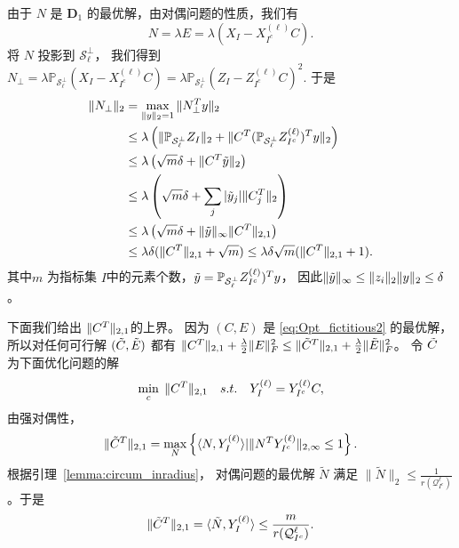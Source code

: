 \documentclass{ctexart}
\begin{document}
由于 $N$ 是 $\mathbf{D}_1$ 的最优解，由对偶问题的性质，我们有
$$ N=\lambda E=\lambda(X_I-X^{(\ell)}_{I^c}C). $$
将 $N$ 投影到 $\mathcal{S}^{\perp}_{\ell}$， 我们得到
$N_{\perp}=\lambda \mathbb{P}_{\mathcal{S}_{\ell}^{\perp}}(X_I-X^{(\ell)}_{I^c}C)
= \lambda \mathbb{P}_{\mathcal{S}_{\ell}^{\perp}}(Z_I-Z^{(\ell)}_{I^c}C)^2$.
于是
\begin{align}
  \|N_{\perp}\|_2 & = \max_{\|y\|_2=1} \|N_{\perp}^T y\|_2 \nonumber \\
  & \leq\lambda \left(\|\mathbb{P}_{\mathcal{S}_{\ell}^{\perp}}Z_I\|_2
  +\|C^T (\mathbb{P}_{\mathcal{S}_{\ell}^{\perp}}Z^{(\ell)}_{I^c})^T y\|_2\right)\nonumber\\
  & \leq \lambda\left( \sqrt{m} \delta + \|C^T \tilde{y}\|_2\right) \nonumber\\
  & \leq \lambda\left( \sqrt{m} \delta + \sum_j |\tilde{y}_j|\|C^T_j\|_2\right) \nonumber\\
  & \leq \lambda\left( \sqrt{m} \delta + \|\tilde{y}\|_{\infty}\|C^T\|_{2,1}\right) \nonumber\\
  & \leq \lambda \delta(\|C^T\|_{2,1}+\sqrt{m}) \leq \lambda\delta\sqrt{m}(\|C^T\|_{2,1}+1). \label{eq:bounding_nu2}
\end{align}
其中$m$ 为指标集 $I$中的元素个数，$\tilde{y}=\mathbb{P}_{\mathcal{S}_{\ell}^{\perp}}Z^{(\ell)}_{I^c})^Ty$，
因此$\|\tilde{y}\|_{\infty} \leq \|z_i\|_2 \|y\|_2 \leq \delta$。

下面我们给出 $\|C^T\|_{2,1}$的上界。
因为 $(C,E)$ 是 \eqref{eq:Opt_fictitious2} 的最优解，所以对任何可行解 $(\tilde{C} ,\tilde{E})$
都有 $\|C^T\|_{2,1}+\frac{\lambda}{2}\|E\|^2_F \leq \|\tilde{C}^T\|_{2,1}+\frac{\lambda}{2}\|\tilde{E}\|_F^2$。
令 $\tilde{C}$ 为下面优化问题的解
\begin{align}\label{eq:Opt_y only}
\min_{c} \; \|C^T\|_{2,1} \quad
s.t. \quad Y^{(\ell)}_I=Y^{(\ell)}_{I^c}C,
\end{align}
由强对偶性，
$$\|\tilde{C}^T\|_{2,1} = \max_{N}\left\{\langle N,Y^{(\ell)}_I\rangle | \|N^T
Y^{(\ell)}_{I^c}\|_{2, \infty}\leq 1\right\}.$$
根据引理~\ref{lemma:circum_inradius}， 对偶问题的最优解 $\tilde{N}$ 满足
$\|\tilde{N}\|_2 \leq \frac{1}{r(\mathcal{Q}_{I^c}^{\ell})}$。于是
$$\|\tilde{C}^T\|_{2,1} = \langle\tilde{N},Y^{(\ell)}_I\rangle \leq \frac{m}{r(\mathcal{Q}_{I^c}^{\ell})}.$$
\end{document}
